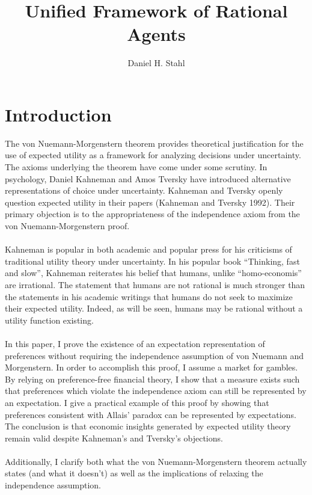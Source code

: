 \documentclass{article}
\begin{document}
	
	
\title{Unified Framework of Rational Agents}
\date{}
\author{Daniel H. Stahl}

\section{Introduction}

The von Nuemann-Morgenstern theorem provides theoretical justification for the use of expected utility as a framework for analyzing decisions under uncertainty.  The axioms underlying the theorem have come under some scrutiny.  In psychology, Daniel Kahneman and Amos Tversky have introduced alternative representations of choice under uncertainty.  Kahneman and Tversky openly question expected utility in their papers (Kahneman and Tversky 1992).  Their primary objection is to the appropriateness of the independence axiom from the von Nuemann-Morgenstern proof.    
\\
\\
Kahneman is popular in both academic and popular press for his criticisms of traditional utility theory under uncertainty.  In his popular book ``Thinking, fast and slow'', Kahneman reiterates his belief that humans, unlike ``homo-economis'' are irrational.  The statement that humans are not rational is much stronger than the statements in his academic writings that humans do not seek to maximize their expected utility.  Indeed, as will be seen, humans may be rational without a utility function existing.  
\\
\\
In this paper, I prove the existence of an expectation representation of preferences without requiring the independence assumption of von Nuemann and Morgenstern.  In order to accomplish this proof, I assume a market for gambles.  By relying on preference-free financial theory, I show that a measure exists such that preferences which violate the independence axiom can still be represented by an expectation.  I give a practical example of this proof by showing that preferences consistent with Allais' paradox can be represented by expectations.  The conclusion is that economic insights generated by expected utility theory remain valid despite Kahneman's and Tversky's objections.   
\\
\\
Additionally, I clarify both what the von Nuemann-Morgenstern theorem actually states (and what it doesn't) as well as the implications of relaxing the independence assumption.
\end{document}
